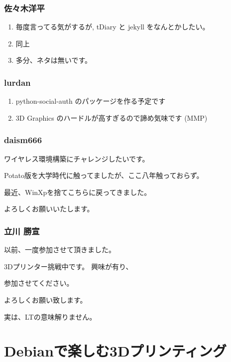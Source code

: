 \documentclass[cjk,dvipdfmx,10pt,compress,%
hyperref={bookmarks=true,bookmarksnumbered=true,bookmarksopen=false,%
colorlinks=false,%
pdftitle={第 82 回 関西 Debian 勉強会},%
pdfauthor={倉敷・のがた・佐々木・かわだ・八津尾},%
pdfsubject={資料},%
}]{beamer}
\begin{document}
\begin{frame}
  \frametitle{ 佐々木洋平 }
  \begin{enumerate}
  \item 毎度言ってる気がするが, tDiary と jekyll をなんとかしたい。
  \item 同上
  \item 多分、ネタは無いです。
  \end{enumerate}
\end{frame}

\begin{frame}
  \frametitle{ lurdan }
  \begin{enumerate}
  \item python-social-auth のパッケージを作る予定です
  \item 3D Graphics のハードルが高すぎるので諦め気味です (MMP)
  \end{enumerate}
\end{frame}

\begin{frame}
  \frametitle{ daism666 }
ワイヤレス環境構築にチャレンジしたいです。

Potato版を大学時代に触ってましたが、ここ八年触っておらず。

最近、WinXpを捨てこちらに戻ってきました。

よろしくお願いいたします。
\end{frame}

\begin{frame}
  \frametitle{ 立川 勝宣 }
以前、一度参加させて頂きました。

3Dプリンター挑戦中です。
興味が有り、

参加させてください。

よろしくお願い致します。

実は、LTの意味解りません。
\end{frame}



\section{Debianで楽しむ3Dプリンティング}

\end{document}
